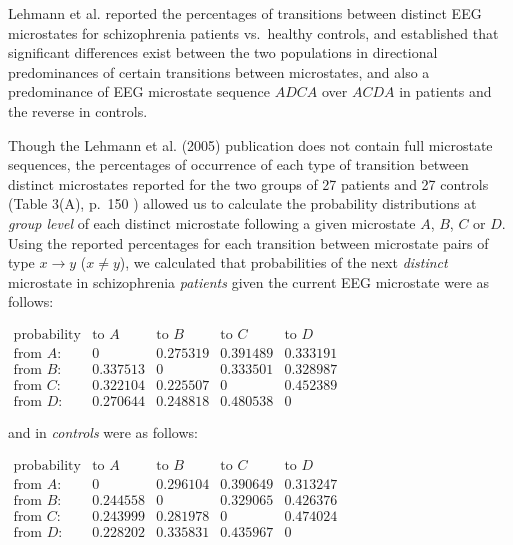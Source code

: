 \documentclass[journal]{IEEEtran}
\begin{document}
Lehmann et al. \cite{Lehmann2005} reported the percentages of transitions between distinct EEG microstates for schizophrenia patients vs.\ healthy controls, and established that   
significant differences exist between the two populations in directional predominances of certain transitions between microstates, and also
 a predominance of EEG microstate sequence
 $ ADCA$ over $ACDA$ in patients and the reverse in controls.
 
Though the Lehmann et al. (2005) publication does not contain full microstate sequences, the percentages of occurrence of each type of transition between distinct microstates reported for the two groups  of 27 patients and 27 controls (Table 3(A), p.~150 \cite{Lehmann2005})  allowed us to
calculate the probability distributions at {\em group level} of each distinct microstate following a given microstate $A$, $B$, $C$ or $D$.  
Using the reported percentages for each transition between microstate pairs of type $x\rightarrow y$ ($x\neq y$), we calculated that probabilities of
the next {\em distinct} microstate in schizophrenia {\em patients} given the current EEG microstate were as follows:\\

\begin{center}
{\small
$\begin{array}{lcccc}
\mbox{probability}& \mbox{to $A$}& \mbox{to $B$}&  \mbox{to $C$} &  \mbox{to $D$}\\
\mbox{from $A$:}&  0 & 0.275319 & 0.391489 & 0.333191 \\
\mbox{from $B$:}& 0.337513 & 0 & 0.333501 & 0.328987 \\
\mbox{from $C$:}& 0.322104 & 0.225507 & 0 & 0.452389\\
\mbox{from $D$:}& 0.270644 & 0.248818 & 0.480538 & 0
\end{array}$\\
}
\end{center}
and  in {\em controls} were as follows:
\begin{center}
{\small
$\begin{array}{lcccc}
\mbox{probability}& \mbox{to $A$}& \mbox{to $B$}&  \mbox{to $C$} &  \mbox{to $D$}\\
\mbox{from $A$:}& 0 & 0.296104 & 0.390649 & 0.313247 \\
\mbox{from $B$:}& 0.244558 & 0 & 0.329065 & 0.426376 \\
\mbox{from $C$:}& 0.243999 & 0.281978 & 0 & 0.474024\\
\mbox{from $D$:}& 0.228202 & 0.335831 & 0.435967 & 0
\end{array}$\\
}
\end{center}
\end{document}
